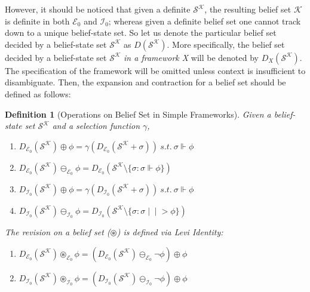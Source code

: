 \documentclass[12pt]{article}
\newtheorem{definition}{Definition}[section]
\newcommand{\ver}{\Vdash}
\newcommand{\inever}{\mid \! \mid \!\!>}
\newcommand{\K}{\mathcal{K}}
\newcommand{\SK}{\mathcal{S}^\mathcal{K}}
\newcommand{\ostar}{\circledast}
\begin{document}
\par
However, it should be noticed that given a definite $\SK$, the resulting belief set $\K$ is definite in both $\mathcal{E}_0$ and $\mathcal{I}_0$; whereas given a definite belief set one cannot track down to a unique belief-state set. So let us denote the particular belief set decided by a belief-state set $\SK$ as $D(\SK)$. More specifically, the belief set decided by a belief-state set $\SK$ \textit{in a framework X} will be denoted by $D_X(\SK)$. The specification of the framework will be omitted unless context is insufficient to disambiguate. Then, the expansion and contraction for a belief set should be defined as follows:
\par
\begin{definition}[Operations on Belief Set in Simple Frameworks]
    Given a belief-state set $\SK$ and a selection function $\gamma$,
    \begin{enumerate}
        \item[($\mathcal{E}_0^\oplus$)] $D_{\mathcal{E}_0} (\SK) \oplus \phi = \gamma (D_{\mathcal{E}_0} (\SK + \sigma)) \ s.t. \ \sigma \ver \phi$ 
        \item[($\mathcal{E}_0^\ominus$)] $D_{\mathcal{E}_0} (\SK) \ominus_{\mathcal{E}_0} \phi = D_{\mathcal{E}_0} (\SK \setminus \{\sigma: \sigma \ver \phi \})$ 
        \item[($\mathcal{I}_0^\oplus$)] $D_{\mathcal{I}_0} (\SK) \oplus \phi = \gamma(D_{\mathcal{I}_0} (\SK + \sigma)) \ s.t. \ \sigma \ver \phi$ 
        \item[($\mathcal{I}_0^\ominus$)] $D_{\mathcal{I}_0} (\SK) \ominus_{\mathcal{I}_0} \phi = D_{\mathcal{I}_0} (\SK \setminus \{\sigma: \sigma \inever \phi \})$ 
    \end{enumerate}
    The revision on a belief set ($\ostar$) is defined via Levi Identity: 
    \begin{enumerate}
        \item[($\mathcal{E}_0^\ostar$)] $D_{\mathcal{E}_0} (\SK) \ostar_{\mathcal{E}_0} \phi = (D_{\mathcal{E}_0} (\SK) \ominus_{\mathcal{E}_0} \lnot \phi) \oplus\phi$
        \item[($\mathcal{I}_0^\ostar$)] $D_{\mathcal{I}_0} (\SK) \ostar_{\mathcal{I}_0} \phi = (D_{\mathcal{I}_0} (\SK) \ominus_{\mathcal{I}_0} \lnot \phi) \oplus \phi$
    \end{enumerate}
\end{definition}
\end{document}
